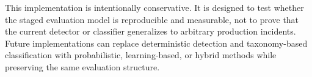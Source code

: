 This implementation is intentionally conservative. It is designed to test whether the staged evaluation model is reproducible and measurable, not to prove that the current detector or classifier generalizes to arbitrary production incidents. Future implementations can replace deterministic detection and taxonomy-based classification with probabilistic, learning-based, or hybrid methods while preserving the same evaluation structure.


